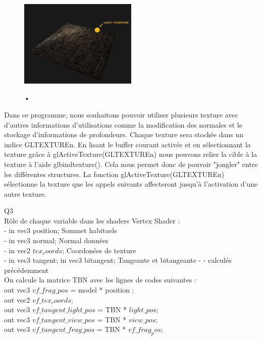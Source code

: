 \documentclass[a4paper]{article}
\begin{document}
\begin{figure}[H]
\centering
\includegraphics[width=0.5\textwidth]{figures/lighting_problem.PNG}\label{lighting_problem}
\caption{•}
\end{figure}

Dans ce programme, nous souhaitons pouvoir utiliser plusieurs texture avec d'autres informations d'utilisations comme la modification des normales et le stockage d'informations de profondeurs. Chaque texture sera stockée dans un indice GLTEXTUREn. En lisant le buffer courant activée et en sélectionnant la texture grâce à glActiveTexture(GLTEXTUREn)   nous pouvons relier la cible à la texture à l'aide glbindtexture(). Cela nous permet donc de pouvoir "jongler" entre les différentes structures. La fonction glActiveTexture(GLTEXTUREn) sélectionne la texture que les appels suivants affecteront jusqu'à l'activation d'une autre texture.

Q3\\  
Rôle de chaque variable dans les shaders Vertex Shader : \\
- in vec3 position; Sommet habituels \\
- in vec3 normal; Normal données \\
- in vec2 $tex_coords$; Coordonées de texture \\
- in vec3 tangent; in vec3 bitangent; Tangeante et bitangeante - - calculés précédemment 
 \\

On calcule la matrice TBN avec les lignes de codes suivantes :\\ 
out vec3 $vf\_frag\_pos$ = model * position ;\\
out vec2 $vf\_tex_coords$;\\
out vec3 $vf\_tangent\_light\_pos$ = TBN * $light\_pos$;\\
out vec3 $vf\_tangent\_view\_pos$ = TBN * $view\_pos$;\\
out vec3 $vf\_tangent\_frag\_pos$ = TBN * $vf\_frag_pos$;\\
\end{document}
